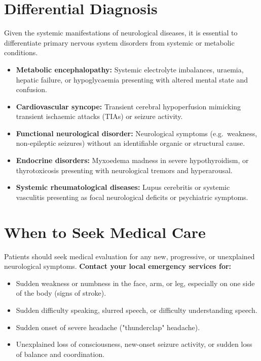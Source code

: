 \section*{Differential Diagnosis}
Given the systemic manifestations of neurological diseases, it is essential to differentiate primary nervous system disorders from systemic or metabolic conditions.
\begin{itemize}
    \item \textbf{Metabolic encephalopathy:} Systemic electrolyte imbalances, uraemia, hepatic failure, or hypoglycaemia presenting with altered mental state and confusion.
    \item \textbf{Cardiovascular syncope:} Transient cerebral hypoperfusion mimicking transient ischaemic attacks (TIAs) or seizure activity.
    \item \textbf{Functional neurological disorder:} Neurological symptoms (e.g.\ weakness, non-epileptic seizures) without an identifiable organic or structural cause.
    \item \textbf{Endocrine disorders:} Myxoedema madness in severe hypothyroidism, or thyrotoxicosis presenting with neurological tremors and hyperarousal.
    \item \textbf{Systemic rheumatological diseases:} Lupus cerebritis or systemic vasculitis presenting as focal neurological deficits or psychiatric symptoms.
\end{itemize}

\section*{When to Seek Medical Care}
Patients should seek medical evaluation for any new, progressive, or unexplained neurological symptoms.
\hfill \break
\textbf{Contact your local emergency services for:}
\begin{itemize}
    \item Sudden weakness or numbness in the face, arm, or leg, especially on one side of the body (signs of stroke).
    \item Sudden difficulty speaking, slurred speech, or difficulty understanding speech.
    \item Sudden onset of severe headache ("thunderclap" headache).
    \item Unexplained loss of consciousness, new-onset seizure activity, or sudden loss of balance and coordination.
\end{itemize}

